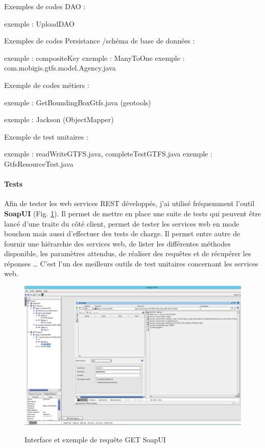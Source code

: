 \begin{itemize}
Exemples de codes DAO :

exemple : UploadDAO

Exemples de codes Persistance /schéma de base de données : 

exemple : compositeKey
exemple : ManyToOne
exemple : com.mobigis.gtfs.model.Agency.java


Exemple de codes métiers :

exemple : GetBoundingBoxGtfs.java (geotools)

exemple : Jackson (ObjectMapper)


Exemple de test unitaires :

exemple : readWriteGTFS.java, completeTestGTFS.java
exemple : GtfsResourceTest.java

\paragraph{Tests}

Afin de tester les web services REST développés, j'ai utilisé fréquemment l'outil \textbf{SoapUI} (Fig. \ref{SoapUIGet}). Il permet de mettre en place une suite de tests qui peuvent être lancé d'une traite du côté client, permet de tester les services web en mode bouchon mais aussi d'effectuer des tests de charge. Il permet entre autre de fournir une hiérarchie des services web, de lister les différentes méthodes disponible, les paramètres attendus, de réaliser des requêtes et de récupérer les réponses … C'est l'un des meilleurs outils de test unitaires concernant les services web.\\

\begin{center}
\begin{figure}[h] \centering
\includegraphics[width=16cm]{images/soapUI_getById_sansResponse_small.png}\\
\caption{\label{SoapUIGet} Interface et exemple de requête \og GET \fg SoapUI}
\end{figure}
\end{center}



\end{itemize}
